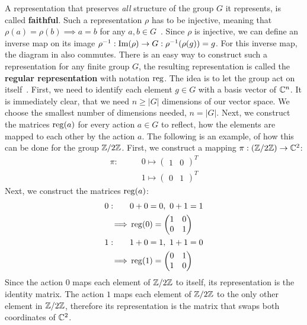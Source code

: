A representation that preserves \textit{all} structure of the group $G$ it represents, is called \textbf{faithful}.
Such a representation $\rho$ has to be injective, meaning that $\rho(a) = \rho(b) \implies a = b$ for any $a, b \in G$~\cite{hein2013}.
Since $\rho$ is injective, we can define an inverse map on its image $\rho^{-1}: \operatorname{Im}(\rho) \to G: \rho^{-1}(\rho(g)) = g$.
For this inverse map, the diagram in  also commutes.
There is an easy way to construct such a representation for any finite group $G$, the resulting representation is called the \textbf{regular representation} with notation $\operatorname{reg}$.
The idea is to let the group act on itself~\cite{fulton2013}.
First, we need to identify each element $g \in G$ with a basis vector of $\mathbb{C}^n$.
It is immediately clear, that we need $n \geq |G|$ dimensions of our vector space.
We choose the smallest number of dimensions needed, $n = |G|$.
Next, we construct the matrices $\operatorname{reg}(a)$ for every action $a \in G$ to reflect, how the elements are mapped to each other by the action $a$.
The following is an example, of how this can be done for the group $\mathbb{Z}/2\mathbb{Z}$.
First, we construct a mapping $\pi: (\mathbb{Z}/2\mathbb{Z}) \to \mathbb{C}^2$:
\begin{align*}
    \pi: \qquad & 0 \mapsto \begin{pmatrix}
        1 & 0
    \end{pmatrix}^T \\
    & 1 \mapsto \begin{pmatrix}
        0 & 1
    \end{pmatrix}^T
\end{align*}
Next, we construct the matrices $\operatorname{reg}(a)$:
\begin{align*}
    0: \qquad & 0 + 0 = 0,\ 0 + 1 = 1 \\
    \implies & \operatorname{reg}(0) = \begin{pmatrix}
        1 & 0 \\
        0 & 1
    \end{pmatrix} \\
    1: \qquad & 1 + 0 = 1,\ 1 + 1 = 0 \\
    \implies & \operatorname{reg}(1) = \begin{pmatrix}
        0 & 1 \\
        1 & 0
    \end{pmatrix}
\end{align*}
Since the action $0$ maps each element of $\mathbb{Z}/2\mathbb{Z}$ to itself, its representation is the identity matrix.
The action $1$ maps each element of $\mathbb{Z}/2\mathbb{Z}$ to the only other element in $\mathbb{Z}/2\mathbb{Z}$, therefore its representation is the matrix that swaps both coordinates of $\mathbb{C}^2$.

